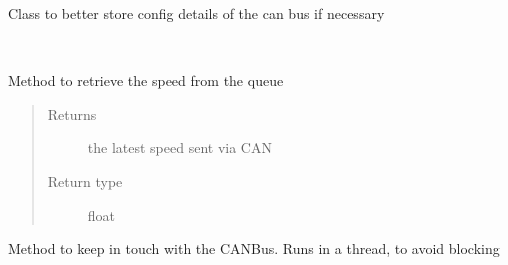 \documentclass[letterpaper,10pt,english]{sphinxmanual}
\begin{document}

\begin{fulllineitems}
\label{\detokenize{driver:lib.driver.CanConfig}}
Class to better store config details of the can bus if necessary

\end{fulllineitems}


\begin{fulllineitems}
\label{\detokenize{driver:lib.driver.CanBus}}~

\begin{fulllineitems}
\label{\detokenize{driver:lib.driver.CanBus.get_speed}}
Method to retrieve the speed from the queue
\begin{quote}\begin{description}
\item[{Returns}] \leavevmode
the latest speed sent via CAN

\item[{Return type}] \leavevmode
float

\end{description}\end{quote}

\end{fulllineitems}


\begin{fulllineitems}
\label{\detokenize{driver:lib.driver.CanBus.run_forever}}
Method to keep in touch with the CAN\sphinxhyphen{}Bus. Runs in a thread, to avoid blocking


\end{fulllineitems}
\end{fulllineitems}
\end{document}
